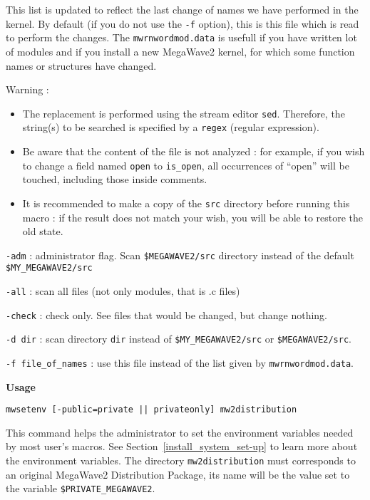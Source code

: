This list is updated to reflect the last change of names we have performed
in the kernel.
By default (if you do not use the \verb+-f+ option), this is this file
which is read to perform the changes.
The \verb+mwrnwordmod.data+ is usefull if you have written lot of modules
and if you install a new MegaWave2 kernel, for which some function names
or structures have changed.

Warning :
\begin{itemize}
\item The replacement is performed using the stream editor \verb+sed+.
Therefore, the string(s) to be searched is specified by a \verb+regex+
(regular expression).
\item Be aware that the content of the file is not analyzed : for example, if you
wish to change a field named \verb+open+ to \verb+is_open+, all occurrences
of ``open'' will be touched, including those inside comments.
\item It is recommended to make a copy of the \verb+src+ directory before
running this macro : if the result does not match your wish, you will be
able to restore the old state.
\end{itemize}
\Next

\Options

\verb+-adm+ : administrator flag. Scan \verb+$MEGAWAVE2/src+ directory instead of the
default \verb+$MY_MEGAWAVE2/src+

\verb+-all+ : scan all files (not only modules, that is .c files)

\verb+-check+ : check only. See files that would be changed, but change nothing.

\verb+-d dir+ : scan directory \verb+dir+ instead of \verb+$MY_MEGAWAVE2/src+ or
\verb+$MEGAWAVE2/src+.

\verb+-f file_of_names+ : use this file instead of the list given by
\verb+mwrnwordmod.data+. 


\newpage

{\Large\bf Usage} \bigskip

\verb+mwsetenv [-public=private || privateonly] mw2distribution+

\Next

\Description
This command helps the administrator to set the environment variables needed by 
most user's macros. See Section~\ref{install_system_set-up} to learn more about
the environment variables.
The directory \verb+mw2distribution+ must corresponds to an original MegaWave2 Distribution Package,
its name will be the value set to the variable \verb+$PRIVATE_MEGAWAVE2+.


